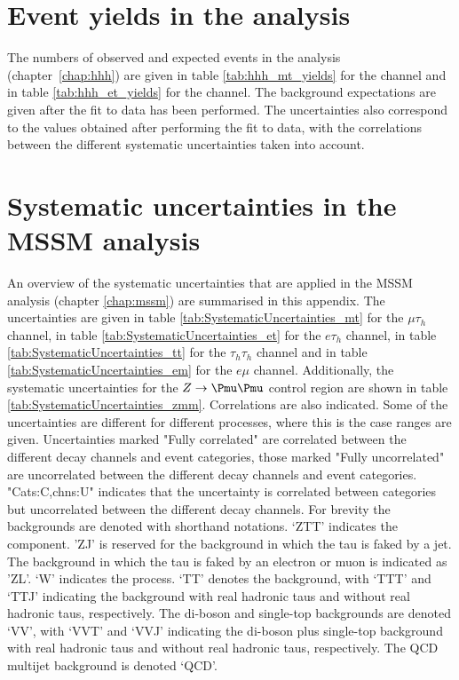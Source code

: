 \appendix
\renewcommand{\chaptername}{Appendix}
\chapter{\texorpdfstring{Event yields in the \Htohhtobbtautau analysis}{Event yields in the H to hh to bbtautau analysis}}
\label{appendix:yields_bbtautau}
The numbers of observed and expected events in the \Htohhtobbtautau analysis \mbox{(chapter \ref{chap:hhh})}
are given in table \ref{tab:hhh_mt_yields} for the \mutau channel and in table \ref{tab:hhh_et_yields} for the \etau channel. The background
expectations are given after the fit to data has been performed. The uncertainties also correspond
to the values obtained after performing the fit to data, with the correlations between the different
systematic uncertainties taken into account. 


\chapter{\texorpdfstring{Systematic uncertainties in the MSSM \AHtotautau analysis}{Overview of systematic uncertainties in the MSSM A/H to tautau analysis}}
\label{appendix:uncerts}
An overview of the systematic uncertainties that are applied in the MSSM \AHtotautau analysis (chapter \ref{chap:mssm})
are summarised in this appendix. The uncertainties are given in
table \ref{tab:SystematicUncertainties_mt} for the $\mu\tau_h$
channel, in table \ref{tab:SystematicUncertainties_et} for the $e\tau_h$ channel,
in table \ref{tab:SystematicUncertainties_tt} for the $\tau_h\tau_h$ channel and
in table \ref{tab:SystematicUncertainties_em} for the $e\mu$ channel. Additionally,
the systematic uncertainties for the $Z\rightarrow\mumu$ control region are shown
in table \ref{tab:SystematicUncertainties_zmm}. Correlations are also indicated.
Some of the uncertainties
are different for different processes, where this is the case ranges are given.
Uncertainties marked "Fully correlated" are correlated between the different
decay channels and event categories, those marked "Fully uncorrelated" are
uncorrelated between the different decay channels and event categories. "Cats:C,chns:U"
indicates that the uncertainty is correlated between categories but uncorrelated between
the different decay channels. For brevity the backgrounds are denoted with shorthand notations.
`ZTT' indicates the \Ztautau component. 'ZJ' is reserved for the \Zellell background
in which the tau is faked by a jet. The \Zellell background in which the tau is faked
by an electron or muon is indicated as 'ZL'. `W' indicates the \Wjets process. `TT' denotes
the \ttbar background, with  `TTT' and `TTJ'
indicating the \ttbar background with real hadronic taus and without real hadronic taus, respectively. 
The di-boson and single-top backgrounds are denoted `VV', with
`VVT' and `VVJ' indicating the di-boson plus single-top background with real hadronic taus
and without real hadronic taus, respectively. The QCD multijet background is denoted `QCD'.


